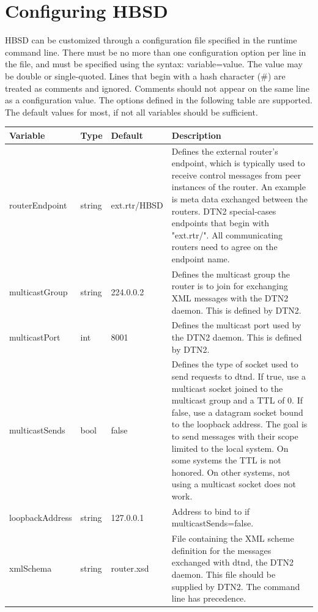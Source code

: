 \section{Configuring HBSD}
HBSD can be customized through a configuration file specified in the runtime command line.  
There must be no more than one configuration option per line in the file, and must be specified using the syntax: variable=value. The value may be double or single-quoted. Lines that begin with a hash character ($\#$) are treated as comments and ignored. Comments should not appear on the same line as a configuration value. The options defined in the following table are supported. The default values for most, if not all variables should be sufficient.

\begin{longtable}[!h]{|p{4cm}|p{1cm}|p{2.2cm}|p{5cm}|}
\hline
\textbf{Variable}& \textbf{Type} & \textbf{Default} & \textbf{Description} \\
\hline
routerEndpoint &  string & ext.rtr/HBSD & Defines the external router's endpoint, which is typically  used to receive control 
messages from peer  instances of the router. An 
example is meta data exchanged between the 
routers. DTN2 special-cases endpoints that begin with 
"ext.rtr/". All communicating routers need to agree on the endpoint name.\\
\hline
multicastGroup & string &  224.0.0.2 & Defines the multicast group the router is to join for  exchanging XML messages with the DTN2 daemon. This is defined by DTN2.\\
\hline
multicastPort & int & 8001 & Defines the multicast port  used by the DTN2 daemon. This is defined by DTN2.\\
\hline
multicastSends & bool & false & Defines the type of socket used to send requests to dtnd. If true, use a multicast socket joined to the multicast group and a TTL of 0. If false, use a datagram socket bound to the loopback address. The goal is to send messages with their scope limited to the local system. On some systems the TTL is not honored. On other systems, not using a multicast socket does not work. \\
\hline
loopbackAddress & string & 127.0.0.1 & Address to bind to if multicastSends=false.\\
\hline
xmlSchema & string  & router.xsd& File containing the XML scheme definition for the 
messages exchanged with dtnd, the DTN2 daemon. This file should be supplied by DTN2. The command line has precedence.\\

\end{longtable}
